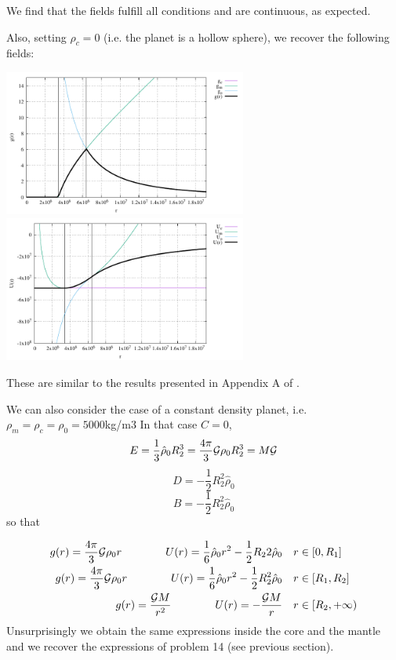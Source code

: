 We find that the fields fulfill all conditions and are continuous, as expected.

Also, setting $\rho_c=0$ (i.e. the planet is a hollow sphere), 
we recover the following fields:
\begin{center}
\includegraphics[width=8cm]{images/gravity_benchmark2/g0.pdf}
\includegraphics[width=8cm]{images/gravity_benchmark2/U0.pdf}
\end{center}

These are similar to the results presented in Appendix A of \textcite{thie18}.

We can also consider the case of a constant density planet, 
i.e. $\rho_m=\rho_c=\rho_0=5000$kg/m3
In that case $C=0$,
\[
E=\frac13 \hat{\rho}_0 R_2^3 = \frac{4\pi}{3} {\cal G} \rho_0 R_2^3 = M {\cal G}
\]
\[
D=-\frac12 R_2^2 \hat{\rho}_0
\]
\[
B=-\frac12 R_2^2 \hat{\rho}_0
\]
so that 

\begin{eqnarray}
g(r)= \frac{4 \pi}{3}{\cal G} \rho_0 r  \qquad\qquad
U(r)= \frac{1}{6}\hat{\rho}_0 r^2   -\frac12 R_22 \hat{\rho}_0 & \quad r\in[0,R_1]\\ 
g(r)= \frac{4\pi}{3} {\cal G} \rho_0 r  \qquad\qquad
U(r)= \frac{1}{6}\hat{\rho}_0 r^2  -\frac12 R_2^2 \hat{\rho}_0 & \quad  r\in[R_1,R_2]\\ 
g(r)= \frac{{\cal G} M}{r^2} \qquad\qquad
U(r)= -\frac{{\cal G}M}{r}  & \quad r\in[R_2,+\infty) 
\end{eqnarray}
Unsurprisingly we obtain the same expressions inside the core and the mantle
and we recover the expressions of problem 14 (see previous section).


